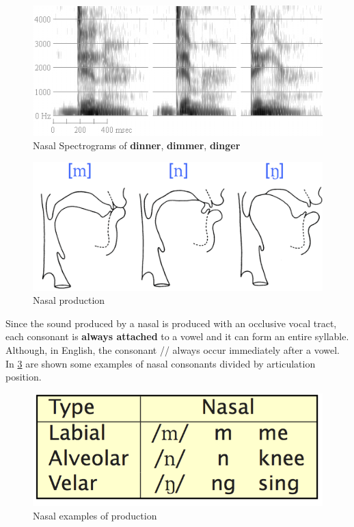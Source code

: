 \begin{figure}[!ht]
    \centering
    \includegraphics[scale=0.6]{Figures/nasal_spectrogram.png}
    \caption{Nasal Spectrograms of \textbf{dinner}, \textbf{dimmer}, \textbf{dinger} \cite{nasal_spectrogram}}
    \label{fig:nasal_spectrogram}
\end{figure}

\begin{figure}[!ht]
    \centering
    \includegraphics[scale=0.5]{Figures/nasal_production.png}
    \caption{Nasal production \cite{mit_phonetics}}
    \label{fig:nasal_prod}
\end{figure}

\noindent Since the sound produced by a nasal is produced with an occlusive vocal tract, each consonant is \textbf{always attached} to a vowel and it can form an entire syllable. Although, in English, the consonant /\textbf{}/ always occur immediately after a vowel. In \ref{fig:nsal_ex} are shown some examples of nasal consonants divided by articulation position.

\begin{figure}[!ht]
    \centering
    \includegraphics[scale=0.5]{Figures/nasal_examples.png}
    \caption{Nasal examples of production \cite{mit_phonetics}}
    \label{fig:nsal_ex}
\end{figure}

